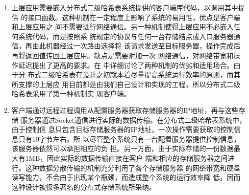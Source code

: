 \begin{enumerate}
  \footnote{如IP地址。}，即可实现配置服务器的无缝替换。
  \item 上层应用需要嵌入分布式二级哈希表系统提供的客户端库代码，以调用其中提供
  的接口函数。这种机制在一定程度上影响了系统的易用性，优点是客户端和上层应用之
  间不需要进行网络通信。另一种机制使得上层应用不必嵌入任何系统代码，而是按照系
  统规定的协议与任何一台存储结点或入口服务器通信，再由此机器经过一次路由选择将
  该请求发送至目标服务器，操作完成后再将返回值传回上层应用。缺点是需要附加一次
  网络通信，对网络带宽和操作延迟提出了更高的要求。在
  中详细讨论了两种机制的优劣和适用场合。由于分
  布式二级哈希表在设计之初就本着尽量提高系统运行效率的原则，而其所支撑的上层应
  用目前都是由我们自己设计和实现的工程，所以分布式二级哈希表采用了第一种机制实
  现客户端。
  \item 客户端通过远程过程调用从配置服务器获取存储服务器的IP地址，再与这些存储
  服务器通过Socket通信进行实际的数据传输。在分布式二级哈希表系统中，由于控制信
  息只包含目标存储服务器的IP地址，一次操作需要获取的控制信息只有10字节左右。所
  以尽管整个系统只有一台配置服务器提供控制信息，该服务器依然可以承担相应的负
  担。另一方面，由于实际存储的一份数据最大有1MB，因此实际的数据传输直接在客户
  端和相应的存储服务器之间进行。这种数据分散传输的机制充分利用了各个存储服务器
  的网络带宽和硬盘读写能力，不会由于出现某个瓶颈，而造成整个系统的运行效率降
  低，因而这种设计被很多著名的分布式存储系统所采纳。\cite{ghemawat2003google}
\end{enumerate}
